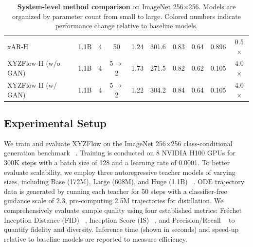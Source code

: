 \documentclass{article}
\theoremstyle{plain}
\theoremstyle{definition}
\theoremstyle{remark}
\begin{document}
\begin{table}[t]
{\begin{tabular}{ l | c | c c | c c | c c | l c}
        xAR-H~\cite{xar} & 1.1B & 4 & 50 & 1.24{\color{red}{\tiny$\downarrow$0.43}} & 301.6{\color{red}{\tiny$\uparrow$25.3}} & 0.83{\color{red}{\tiny$\uparrow$0.03}} & 0.64{\color{red}{\tiny$\uparrow$0.02}} & 0.896{\color{blue}{\tiny$\uparrow$0.473}} & 0.5$\times${\color{blue}{\tiny$\downarrow$0.5}} \\
        
        \rowcolor{gray!10} XYZFlow-H (w/o GAN) & 1.1B & 4 & 5$\rightarrow$2 & 1.73{\color{red}{\tiny$\downarrow$0.06}} & 271.5{\color{blue}{\tiny$\downarrow$4.8}} & 0.82{\color{red}{\tiny$\uparrow$0.02}} & 0.62 & 0.105{\color{red}{\tiny$\downarrow$0.318}} & 4.0$\times${\color{red}{\tiny$\uparrow$3.0}} \\
        \rowcolor{gray!25} XYZFlow-H (w/ GAN) & 1.1B & 4 & 5$\rightarrow$2 & 1.22{\color{red}{\tiny$\downarrow$0.45}} & 304.2{\color{red}{\tiny$\uparrow$27.9}} & 0.84{\color{red}{\tiny$\uparrow$0.04}} & 0.64{\color{red}{\tiny$\uparrow$0.02}} & 0.105{\color{red}{\tiny$\downarrow$0.318}} & 4.0$\times${\color{red}{\tiny$\uparrow$3.0}} \\
        
        \bottomrule
    \end{tabular}}
\caption{\textbf{System-level method comparison} on ImageNet 256×256. Models are organized by parameter count from small to large. Colored numbers indicate performance change relative to baseline models.}
    \label{tab:comparison}
\vspace{-7mm}
\end{table}
\vspace{-2mm}
\subsection{Experimental Setup}
\vspace{-2mm}
\label{subsec:imagenet_experiments}
We train and evaluate XYZFlow on the ImageNet 256×256 class-conditional generation benchmark ~\cite{deng2009imagenet}. Training is conducted on 8 NVIDIA H100 GPUs for 300K steps with a batch size of 128 and a learning rate of 0.0001. To better evaluate scalability, we employ three autoregressive teacher models of varying sizes, including Base (172M), Large (608M), and Huge (1.1B) ~\cite{xar}. ODE trajectory data is generated by running each teacher for 50 steps with a classifier-free guidance scale of 2.3, pre-computing 2.5M trajectories for distillation. We comprehensively evaluate sample quality using four established metrics: Fréchet Inception Distance (FID) ~\cite{fid}, Inception Score (IS) ~\cite{is}, and Precision/Recall ~\cite{dhariwal2021diffusion} to quantify fidelity and diversity. Inference time (shown in seconds) and speed-up relative to baseline models are reported to measure efficiency.
\end{document}
